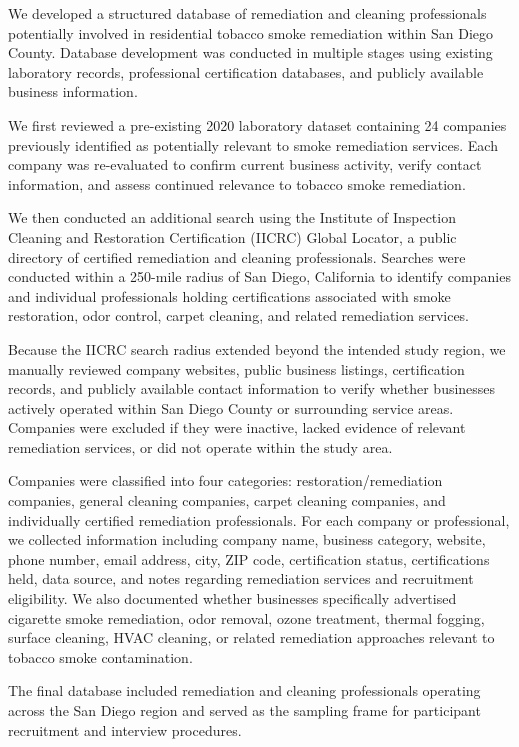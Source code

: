 \documentclass[stu]{apa7}
\begin{document}
We developed a structured database of remediation and cleaning professionals potentially involved in residential tobacco smoke remediation within San Diego County. Database development was conducted in multiple stages using existing laboratory records, professional certification databases, and publicly available business information.

We first reviewed a pre-existing 2020 laboratory dataset containing 24 companies previously identified as potentially relevant to smoke remediation services. Each company was re-evaluated to confirm current business activity, verify contact information, and assess continued relevance to tobacco smoke remediation.

We then conducted an additional search using the Institute of Inspection Cleaning and Restoration Certification (IICRC) Global Locator, a public directory of certified remediation and cleaning professionals. Searches were conducted within a 250-mile radius of San Diego, California to identify companies and individual professionals holding certifications associated with smoke restoration, odor control, carpet cleaning, and related remediation services.

Because the IICRC search radius extended beyond the intended study region, we manually reviewed company websites, public business listings, certification records, and publicly available contact information to verify whether businesses actively operated within San Diego County or surrounding service areas. Companies were excluded if they were inactive, lacked evidence of relevant remediation services, or did not operate within the study area.

Companies were classified into four categories: restoration/remediation companies, general cleaning companies, carpet cleaning companies, and individually certified remediation professionals. For each company or professional, we collected information including company name, business category, website, phone number, email address, city, ZIP code, certification status, certifications held, data source, and notes regarding remediation services and recruitment eligibility. We also documented whether businesses specifically advertised cigarette smoke remediation, odor removal, ozone treatment, thermal fogging, surface cleaning, HVAC cleaning, or related remediation approaches relevant to tobacco smoke contamination.

The final database included remediation and cleaning professionals operating across the San Diego region and served as the sampling frame for participant recruitment and interview procedures.
\end{document}
